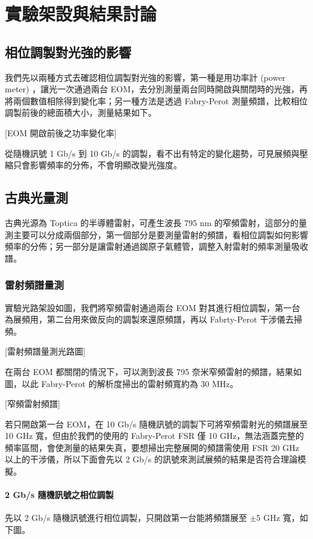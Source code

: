 \documentclass[class=NCU_thesis, crop=false]{standalone}
\begin{document}
\chapter{實驗架設與結果討論}

\section{相位調製對光強的影響}
我們先以兩種方式去確認相位調製對光強的影響，第一種是用功率計 (power meter) ，讓光一次通過兩台 EOM，去分別測量兩台同時開啟與關閉時的光強，再將兩個數值相除得到變化率；另一種方法是透過 Fabry-Perot 測量頻譜，比較相位調製前後的總面積大小，測量結果如下。

[EOM 開啟前後之功率變化率]

從隨機訊號 1 Gb/s 到 10 Gb/s 的調製，看不出有特定的變化趨勢，可見展頻與壓縮只會影響頻率的分佈，不會明顯改變光強度。

\section{古典光量測}
古典光源為 Toptica 的半導體雷射，可產生波長 795 nm 的窄頻雷射，這部分的量測主要可以分成兩個部分，第一個部分是要測量雷射的頻譜，看相位調製如何影響頻率的分佈；另一部分是讓雷射通過銣原子氣體管，調整入射雷射的頻率測量吸收譜。

\subsection{雷射頻譜量測}

實驗光路架設如圖，我們將窄頻雷射通過兩台 EOM 對其進行相位調製，第一台為展頻用，第二台用來做反向的調製來還原頻譜，再以 Fabrty-Perot 干涉儀去掃頻。

[雷射頻譜量測光路圖]

在兩台 EOM 都關閉的情況下，可以測到波長 795 奈米窄頻雷射的頻譜，結果如圖，以此 Fabry-Perot 的解析度掃出的雷射頻寬約為 30 MHz。

[窄頻雷射頻譜]

若只開啟第一台 EOM，在 10 Gb/s 隨機訊號的調製下可將窄頻雷射光的頻譜展至 10 GHz 寬，但由於我們的使用的 Fabry-Perot FSR 僅 10 GHz，無法涵蓋完整的頻率區間，會使測量的結果失真，要想掃出完整展開的頻譜需使用 FSR 20 GHz 以上的干涉儀，所以下面會先以 2 Gb/s 的訊號來測試展頻的結果是否符合理論模擬。

\subsubsection{2 Gb/s 隨機訊號之相位調製}
先以 2 Gb/s 隨機訊號進行相位調製，只開啟第一台能將頻譜展至 $\pm$5 GHz 寬，如下圖。
\end{document}

